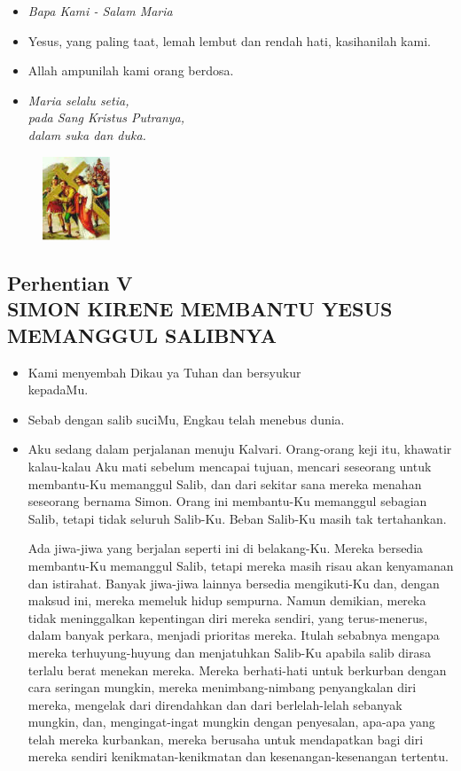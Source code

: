\documentclass[a5paper,headsepline,titlepage,10pt,nnormalheadings,DIVcalc]{scrbook}
\newcommand{\BU}[1]{\begin{itemize} \item[U:] #1 \end{itemize}}
\newcommand{\BP}[1]{\begin{itemize} \item[P:] #1 \end{itemize}}
\newcommand{\kamiMenyembah}{\BP{ Kami menyembah Dikau ya Tuhan dan bersyukur\\kepadaMu.}
\BU{ Sebab dengan salib suciMu, Engkau telah menebus dunia.}
}
\newcommand{\kasihanilahKami}{\BP{Yesus, yang paling taat, lemah lembut dan rendah hati, kasihanilah kami.}
\BU{Allah ampunilah kami orang berdosa.}}
\begin{document}
\large\begin{itemize}\item[~]\it{Bapa Kami - Salam Maria}\end{itemize}\normalsize
\kasihanilahKami

\begin{itemize}
\item[5.] \it{Maria selalu setia,\\ 
	pada Sang Kristus Putranya,\\ 
	dalam suka dan duka.}
\end{itemize}

\begin{figure}
\includegraphics[width=2cm]{jalansalib_files/05_small.jpg}
\end{figure}
\subsection*{Perhentian V\\
SIMON KIRENE MEMBANTU YESUS\\MEMANGGUL SALIBNYA}

\kamiMenyembah
\BP{Aku sedang dalam perjalanan menuju Kalvari. Orang-orang keji itu, khawatir kalau-kalau Aku mati sebelum mencapai tujuan, mencari seseorang untuk membantu-Ku memanggul Salib, dan dari sekitar sana mereka menahan seseorang bernama Simon. Orang ini membantu-Ku memanggul sebagian Salib, tetapi tidak seluruh Salib-Ku. Beban Salib-Ku masih tak tertahankan.

Ada jiwa-jiwa yang berjalan seperti ini di belakang-Ku. Mereka bersedia membantu-Ku memanggul Salib, tetapi mereka masih risau akan kenyamanan dan istirahat. Banyak jiwa-jiwa lainnya bersedia mengikuti-Ku dan, dengan maksud ini, mereka memeluk hidup sempurna. Namun demikian, mereka tidak meninggalkan kepentingan diri mereka sendiri, yang terus-menerus, dalam banyak perkara, menjadi prioritas mereka. Itulah sebabnya mengapa mereka terhuyung-huyung dan menjatuhkan Salib-Ku apabila salib dirasa terlalu berat menekan mereka. Mereka berhati-hati untuk berkurban dengan cara seringan mungkin, mereka menimbang-nimbang penyangkalan diri mereka, mengelak dari direndahkan dan dari berlelah-lelah sebanyak mungkin, dan, mengingat-ingat mungkin dengan penyesalan, apa-apa yang telah mereka kurbankan, mereka berusaha untuk mendapatkan bagi diri mereka sendiri kenikmatan-kenikmatan dan kesenangan-kesenangan tertentu.}
\end{document}
